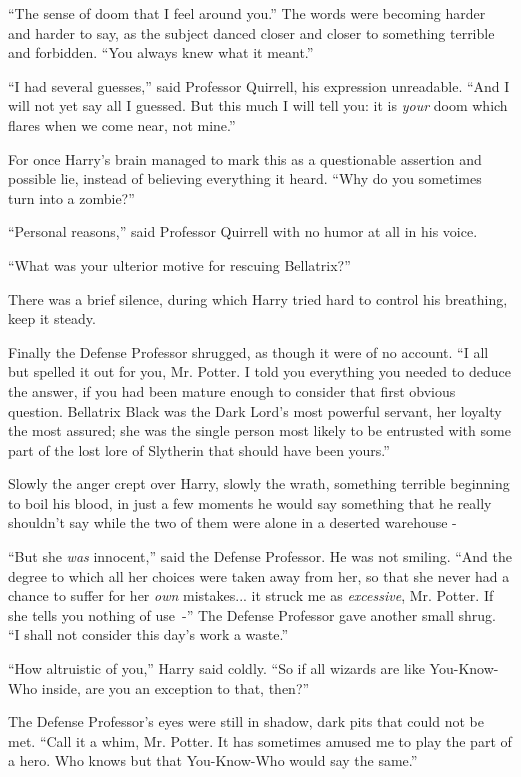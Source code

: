 ``The sense of doom that I feel around you.'' The words were becoming harder and harder to say, as the subject danced closer and closer to something terrible and forbidden. ``You always knew what it meant.''

``I had several guesses,'' said Professor Quirrell, his expression unreadable. ``And I will not yet say all I guessed. But this much I will tell you: it is \emph{your} doom which flares when we come near, not mine.''

For once Harry's brain managed to mark this as a questionable assertion and possible lie, instead of believing everything it heard. ``Why do you sometimes turn into a zombie?''

``Personal reasons,'' said Professor Quirrell with no humor at all in his voice.

``What was your ulterior motive for rescuing Bellatrix?''

There was a brief silence, during which Harry tried hard to control his breathing, keep it steady.

Finally the Defense Professor shrugged, as though it were of no account. ``I all but spelled it out for you, Mr. Potter. I told you everything you needed to deduce the answer, if you had been mature enough to consider that first obvious question. Bellatrix Black was the Dark Lord's most powerful servant, her loyalty the most assured; she was the single person most likely to be entrusted with some part of the lost lore of Slytherin that should have been yours.''

Slowly the anger crept over Harry, slowly the wrath, something terrible beginning to boil his blood, in just a few moments he would say something that he really shouldn't say while the two of them were alone in a deserted warehouse -

``But she \emph{was} innocent,'' said the Defense Professor. He was not smiling. ``And the degree to which all her choices were taken away from her, so that she never had a chance to suffer for her \emph{own} mistakes... it struck me as \emph{excessive}, Mr. Potter. If she tells you nothing of use~-'' The Defense Professor gave another small shrug. ``I shall not consider this day's work a waste.''

``How altruistic of you,'' Harry said coldly. ``So if all wizards are like You-Know-Who inside, are you an exception to that, then?''

The Defense Professor's eyes were still in shadow, dark pits that could not be met. ``Call it a whim, Mr. Potter. It has sometimes amused me to play the part of a hero. Who knows but that You-Know-Who would say the same.''

